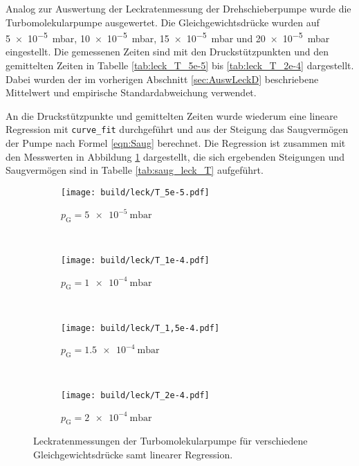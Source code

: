 Analog zur Auswertung der Leckratenmessung der Drehschieberpumpe wurde die
Turbomolekularpumpe ausgewertet.
Die Gleichgewichtsdrücke wurden auf
\SI{5e-5}{\milli\bar}, \SI{10e-5}{\milli\bar}, \SI{15e-5}{\milli\bar} und \SI{20e-5}{\milli\bar}
eingestellt. Die gemessenen Zeiten sind mit den Druckstützpunkten und den
gemittelten Zeiten in Tabelle \ref{tab:leck_T_5e-5} bis \ref{tab:leck_T_2e-4}
dargestellt. Dabei wurden der im vorherigen Abschnitt \ref{sec:AuswLeckD}
beschriebene Mittelwert und empirische Standardabweichung verwendet.





\FloatBarrier

An die Druckstützpunkte und gemittelten Zeiten wurde wiederum eine lineare
Regression mit \texttt{curve\_fit} durchgeführt und aus der Steigung das
Saugvermögen der Pumpe nach Formel \eqref{eqn:Saug} berechnet.
Die Regression ist zusammen mit den Messwerten in Abbildung
\ref{fig:leck_T} dargestellt, die sich ergebenden Steigungen und
Saugvermögen sind in Tabelle \ref{tab:saug_leck_T} aufgeführt.

\begin{figure}
  \centering
  \begin{subfigure}[b]{0.48\textwidth}
    \texttt{[image: build/leck/T\_5e-5.pdf]}
    \caption{$p_\text{G} = \SI{5e-5}{\milli\bar}$}
  \end{subfigure}
  ~ %
  \begin{subfigure}[b]{0.48\textwidth}
    \texttt{[image: build/leck/T\_1e-4.pdf]}
    \caption{$p_\text{G} = \SI{1e-4}{\milli\bar}$}
  \end{subfigure}
  \\
  \begin{subfigure}[b]{0.48\textwidth}
    \texttt{[image: build/leck/T\_1,5e-4.pdf]}
    \caption{$p_\text{G} = \SI{1,5e-4}{\milli\bar}$}
  \end{subfigure}
  ~ %
  \begin{subfigure}[b]{0.48\textwidth}
    \texttt{[image: build/leck/T\_2e-4.pdf]}
    \caption{$p_\text{G} = \SI{2e-4}{\milli\bar}$}
  \end{subfigure}
  \caption{Leckratenmessungen der Turbomolekularpumpe für verschiedene Gleichgewichtsdrücke samt linearer Regression.}
  \label{fig:leck_T}
\end{figure}


\FloatBarrier
